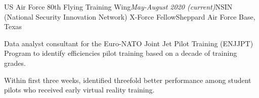 \begin{rSubsection}{US Air Force 80th Flying Training Wing}{\em May-August 2020 (current)}{NSIN (National Security Innovation Network) X-Force Fellow}{Sheppard Air Force Base, Texas}
\item Data analyst consultant for the Euro-NATO Joint Jet Pilot Training (ENJJPT) Program to identify efficiencies pilot training based on a decade of training grades.
\item Within first three weeks, identified threefold better performance among student pilots who received early virtual reality training.
\end{rSubsection}